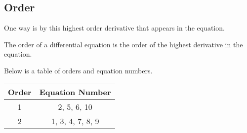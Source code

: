 \subsection{Order}
One way is by this highest order derivative that appears in the equation.
\begin{definition}
	The order of a differential equation is the order of the highest derivative in the equation.
\end{definition}
\noindent
Below is a table of orders and equation numbers.
\begin{table}[H]
	\centering
	\begin{tabular}{c|c}
		Order & Equation Number \\
		\hline
		1 &  2, 5, 6, 10 \\
		2 & 1, 3, 4, 7, 8, 9 \\
	\end{tabular}
\end{table}